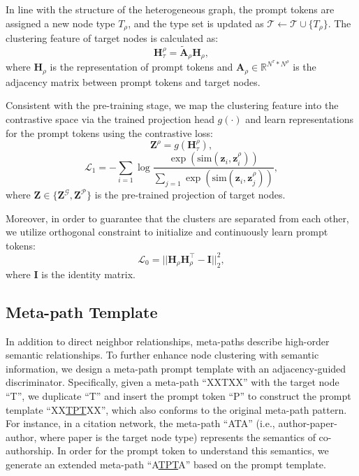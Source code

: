 In line with the structure of the heterogeneous graph, the prompt tokens are assigned a new node type $T_\rho$, and the type set is updated as $\mathcal{T} \leftarrow \mathcal{T} \cup \{T_\rho\}$. The clustering feature of target nodes is calculated as: 
\begin{equation}\label{equ::cluster}
	\bm H_\tau^\rho = \tilde{\bm A}_\rho \bm H_\rho,
\end{equation}
where $\bm H_\rho$ is the representation of prompt tokens and $\bm A_\rho \in \mathbb{R}^{N^\tau*N^\rho}$ is the adjacency matrix between prompt tokens and target nodes.

Consistent with the pre-training stage, we map the clustering feature into the contrastive space via the trained projection head $g(\cdot)$ and learn representations for the prompt tokens using the contrastive loss:
\begin{equation}
	\bm Z^{\rho} = g(\bm H_\tau^\rho),
\end{equation}
\begin{equation}\label{equ::prompt}
	\mathcal{L}_1 = -\sum_{i=1} \log \frac{\exp(\text{sim}(\bm z_i,\bm z_i^\rho))}{\sum_{j=1}\exp(\text{sim}(\bm z_i,\bm z_j^\rho))},
\end{equation}
where $\bm Z \in \{\bm Z^\mathcal{G},\bm Z^\mathcal{P}\}$ is the pre-trained projection of target nodes.

Moreover, in order to guarantee that the clusters are separated from each other, we utilize orthogonal constraint \cite{GPPT} to initialize and continuously learn prompt tokens:
\begin{equation}\label{equ::orthogonal}
    \mathcal{L}_0 = ||\bm H_\rho \bm H_\rho^\top - \bm I||_2^2,
\end{equation}
where $\bm I$ is the identity matrix.

\subsection{Meta-path Template}\label{sec::template}

In addition to direct neighbor relationships, meta-paths describe high-order semantic relationships. To further enhance node clustering with semantic information, we design a meta-path prompt template with an adjacency-guided discriminator. Specifically, given a meta-path ``XXTXX'' with the target node ``T'', we duplicate ``T'' and insert the prompt token ``P'' to construct the prompt template ``XX\underline{TPT}XX'', which also conforms to the original meta-path pattern. For instance, in a citation network, the meta-path ``ATA'' (i.e., author-paper-author, where paper is the target node type) represents the semantics of co-authorship. In order for the prompt token to understand this semantics, we generate an extended meta-path ``A\underline{TPT}A'' based on the prompt template.


